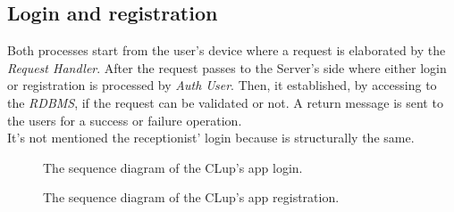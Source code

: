 \pagebreak


\subsection{Login and registration}

Both processes start from the user's device where a request is elaborated by the \textit{Request Handler}. After the request passes to the Server's side where either login or registration is processed by \textit{Auth User}. Then, it established, by accessing to the \textit{RDBMS}, if the request can be validated or not. A return message is sent to the users for a success or failure operation. \\
It's not mentioned the receptionist' login because is structurally the same.



\begin{figure}[H]
  \label{LoginSD}
  \centering
    \caption{The sequence diagram of the CLup's app login.}
\end{figure} 


\begin{figure}[H]
  \label{RegistrationSD}
  \centering
    \caption{The sequence diagram of the CLup's app registration.}
\end{figure} 

